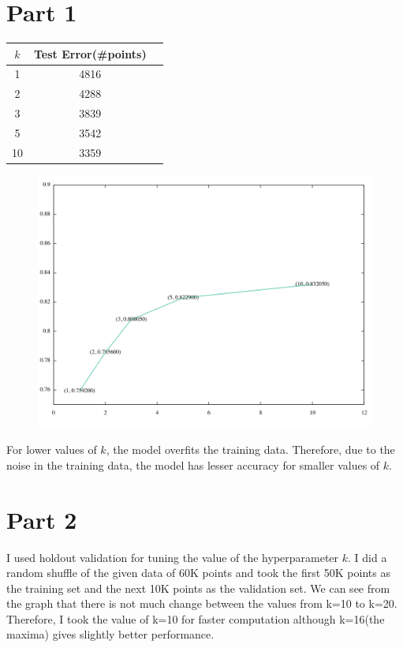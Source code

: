 \documentclass[a4paper,11pt]{article}
\begin{document}
\begin{mlsolution}
\section*{Part 1}
\begin{center}
\begin{tabular}{ |c|c|c| } 
 \hline
 $k$ & Test Error(\#points) \\ \hline
 1 & 4816 \\ 
 2 & 4288 \\
 3 & 3839 \\
 5 & 3542 \\
 10 & 3359 \\ 
 \hline
\end{tabular}
\end{center}

\begin{figure}[th]%
\centering
\includegraphics[scale = 0.5]{q61_plot.png}%
\label{fig:proto}%
\end{figure}

For lower values of $k$, the model overfits the training data. Therefore, due to the noise in the training data, the model has lesser accuracy for smaller values of $k$.

\section*{Part 2}
I used holdout validation for tuning the value of the hyperparameter $k$. I did a random shuffle of the given data of 60K points and took the first 50K points as the training set and the next 10K points as the validation set. We can see from the graph that there is not much change between the values from k=10 to k=20. Therefore, I took the value of k=10 for faster computation although k=16(the maxima) gives slightly better performance.


\end{mlsolution}
\end{document}

